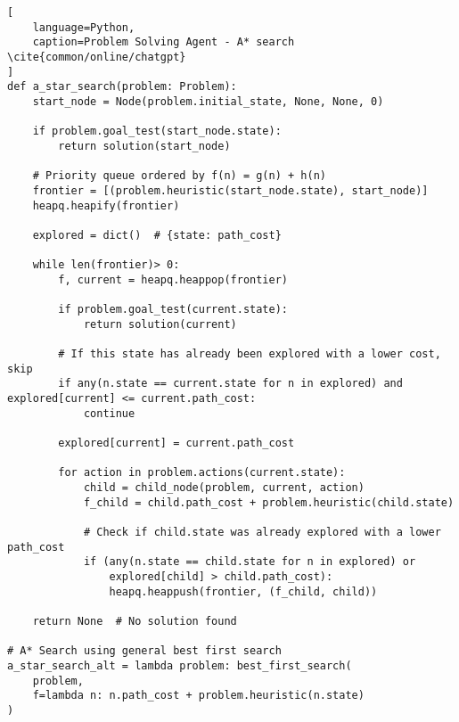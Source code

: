 \begin{lstlisting}[
    language=Python,
    caption=Problem Solving Agent - A* search \cite{common/online/chatgpt}
]
def a_star_search(problem: Problem):
    start_node = Node(problem.initial_state, None, None, 0)

    if problem.goal_test(start_node.state):
        return solution(start_node)

    # Priority queue ordered by f(n) = g(n) + h(n)
    frontier = [(problem.heuristic(start_node.state), start_node)]
    heapq.heapify(frontier)

    explored = dict()  # {state: path_cost}

    while len(frontier)> 0:
        f, current = heapq.heappop(frontier)

        if problem.goal_test(current.state):
            return solution(current)

        # If this state has already been explored with a lower cost, skip
        if any(n.state == current.state for n in explored) and explored[current] <= current.path_cost:
            continue

        explored[current] = current.path_cost

        for action in problem.actions(current.state):
            child = child_node(problem, current, action)
            f_child = child.path_cost + problem.heuristic(child.state)

            # Check if child.state was already explored with a lower path_cost
            if (any(n.state == child.state for n in explored) or
                explored[child] > child.path_cost):
                heapq.heappush(frontier, (f_child, child))

    return None  # No solution found

# A* Search using general best first search
a_star_search_alt = lambda problem: best_first_search(
    problem,
    f=lambda n: n.path_cost + problem.heuristic(n.state)
)
\end{lstlisting}











